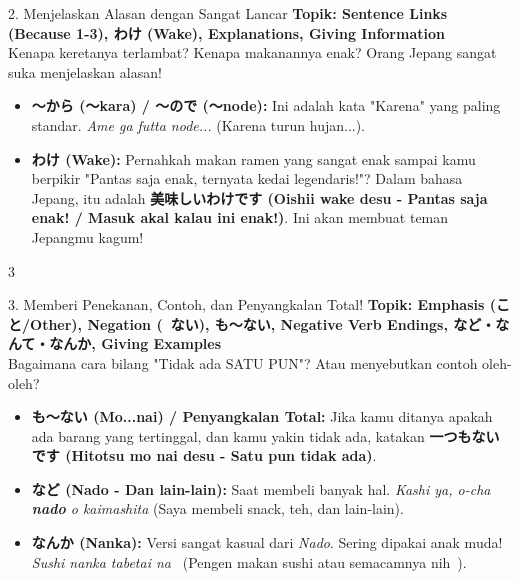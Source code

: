 \begin{lessonbox}{2. Menjelaskan Alasan dengan Sangat Lancar}
    \textbf{Topik: Sentence Links (Because 1-3), わけ (Wake), Explanations, Giving Information} \\
    Kenapa keretanya terlambat? Kenapa makanannya enak? Orang Jepang sangat suka menjelaskan alasan!
    \begin{itemize}
        \item \textbf{〜から (〜kara) / 〜ので (〜node):} Ini adalah kata "Karena" yang paling standar. \textit{Ame ga futta node...} (Karena turun hujan...).
        \item \textbf{わけ (Wake):} Pernahkah makan ramen yang sangat enak sampai kamu berpikir "Pantas saja enak, ternyata kedai legendaris!"? Dalam bahasa Jepang, itu adalah \textbf{美味しいわけです (Oishii wake desu - Pantas saja enak! / Masuk akal kalau ini enak!)}. Ini akan membuat teman Jepangmu kagum!
    \end{itemize}
\end{lessonbox}

\begin{convobox}{3}
    \noindent
      
     

    \vspace{1.5em}
\end{convobox}

\begin{lessonbox}{3. Memberi Penekanan, Contoh, dan Penyangkalan Total!}
    \textbf{Topik: Emphasis (こと/Other), Negation (~ない), も～ない, Negative Verb Endings, など・なんて・なんか, Giving Examples} \\
    Bagaimana cara bilang "Tidak ada SATU PUN"? Atau menyebutkan contoh oleh-oleh?
    \begin{itemize}
        \item \textbf{も〜ない (Mo...nai) / Penyangkalan Total:} Jika kamu ditanya apakah ada barang yang tertinggal, dan kamu yakin tidak ada, katakan \textbf{一つもないです (Hitotsu mo nai desu - Satu pun tidak ada)}.
        \item \textbf{など (Nado - Dan lain-lain):} Saat membeli banyak hal. \textit{Kashi ya, o-cha \textbf{nado} o kaimashita} (Saya membeli snack, teh, dan lain-lain).
        \item \textbf{なんか (Nanka):} Versi sangat kasual dari \textit{Nado}. Sering dipakai anak muda! \textit{Sushi nanka tabetai na~} (Pengen makan sushi atau semacamnya nih~).
    \end{itemize}
\end{lessonbox}

